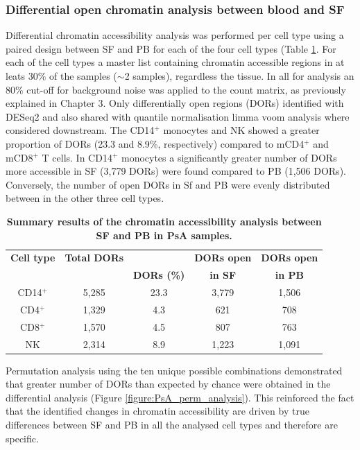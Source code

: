 \subsubsection{Differential open chromatin analysis between blood and SF}
Differential chromatin accessibility analysis was performed per cell type using a paired design between SF and PB for each of the four cell types (Table \ref{tab:PSA_DOCs_results}. For each of the cell types a master list containing chromatin accessible regions in at leats 30\% of the samples ($\sim$2 samples), regardless the tissue. In all for analysis an 80\% cut-off for background noise was applied to the count matrix, as previously explained in Chapter 3. Only differentially open regions (DORs) identified with DESeq2 and also shared with quantile normalisation limma voom analysis where considered downstream. The CD14$^+$ monocytes and NK showed a greater proportion of DORs (23.3 and 8.9\%, respectively) compared to mCD4$^+$ and mCD8$^+$ T cells. In CD14$^+$ monocytes a significantly greater number of DORs more accessible  in SF (3,779 DORs) were found compared to PB (1,506 DORs). Conversely, the number of open DORs in Sf and PB were evenly distributed between in the other three cell types.


\begin{table}[htbp]
\centering
\begin{tabular}{@{} c c c c c}
\toprule
\textbf{Cell type}  & \textbf{Total DORs} &  \textbf{Proportion  &\textbf{DORs open} & \textbf{DORs open } \\
                    &                     &  \textbf{DORs (\%)}  &\textbf{in SF}     & \textbf{in PB} \\
\midrule
\midrule
CD14$^+$ & 5,285 & 23.3 & 3,779 & 1,506 \\
CD4$^+$ & 1,329 & 4.3 & 621 & 708 \\
CD8$^+$ & 1,570 & 4.5 & 807 & 763 \\
NK      & 2,314 & 8.9 & 1,223 & 1,091 \\
\bottomrule
\end{tabular}
\medskip %
\caption[Summary results of the chromatin accessibility analysis between SF and PB in PsA samples]{\textbf{Summary results of the chromatin accessibility analysis between SF and PB in PsA samples.}}
\label{tab:PSA_DOCs_results}
\end{table}

Permutation analysis using the ten unique possible combinations demonstrated that greater number of DORs than expected by chance were obtained in the differential analysis (Figure \ref{figure:PsA_perm_analysis}). This reinforced the fact that the identified changes in chromatin accessibility are driven by true differences between SF and PB in all the analysed cell types and therefore are specific.
  
